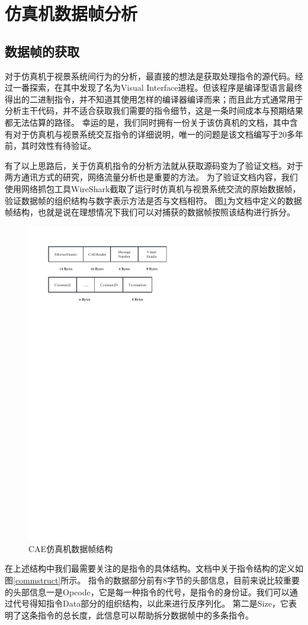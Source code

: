 \section{仿真机数据帧分析}
\subsection{数据帧的获取}
对于仿真机于视景系统间行为的分析，最直接的想法是获取处理指令的源代码。经过一番探索，在其中发现了名为Visual Interface进程。但该程序是编译型语言最终得出的二进制指令，并不知道其使用怎样的编译器编译而来；而且此方式通常用于分析主干代码，并不适合获取我们需要的指令细节，这是一条时间成本与预期结果都无法估算的路径。
幸运的是，我们同时拥有一份关于该仿真机的文档，其中含有对于仿真机与视景系统交互指令的详细说明，唯一的问题是该文档编写于20多年前，其时效性有待验证。
\par
有了以上思路后，关于仿真机指令的分析方法就从获取源码变为了验证文档。对于两方通讯方式的研究，网络流量分析也是重要的方法。
为了验证文档内容，我们使用网络抓包工具WireShark截取了运行时仿真机与视景系统交流的原始数据帧，验证数据帧的组织结构与数字表示方法是否与文档相符。
图\ref{datastruct}为文档中定义的数据帧结构，也就是说在理想情况下我们可以对捕获的数据帧按照该结构进行拆分。
\begin{figure}[h!]
    \begin{center}
        \includegraphics[width=.8\textwidth]{pictures/datastruct.pdf}
        \caption{CAE仿真机数据帧结构}
        \label{datastruct}
    \end{center}
\end{figure}
\par
在上述结构中我们最需要关注的是指令的具体结构。文档中关于指令结构的定义如图\ref{commstruct}所示。
指令的数据部分前有8字节的头部信息，目前来说比较重要的头部信息一是Opcode，它是每一种指令的代号，是指令的身份证。我们可以通过代号得知指令Data部分的组织结构，以此来进行反序列化。
第二是Size，它表明了这条指令的总长度，此信息可以帮助拆分数据帧中的多条指令。

